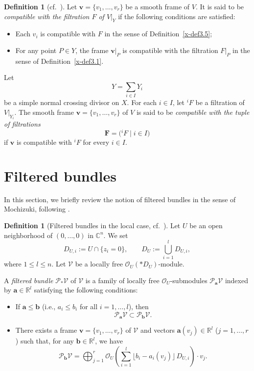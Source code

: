 \documentclass[12pt,twoside]{amsart}
\theoremstyle{definition}
\newtheorem{defn}[thm]{Definition}
\begin{document}
\begin{defn}[{cf.~\cite[Definition 2.17]{mochizuki1}}]\label{x-def3.6}
Let $\bm v=\{v_1,\ldots,v_r\}$ be a smooth frame of $V$.
It is said to be \emph{compatible with the filtration $F$ of $V|_Y$} if
the following conditions are satisfied:
\begin{itemize}
\item[(1)] Each $v_i$ is compatible with $F$ in the sense of
Definition~\ref{x-def3.5};
\item[(2)] For any point $P\in Y$, the frame $\bm v|_P$
is compatible with the filtration $F|_P$
in the sense of Definition~\ref{x-def3.1}. 
\end{itemize} 

Let
\[
Y=\sum_{i\in I} Y_i
\]
be a simple normal crossing divisor on $X$.
For each $i\in I$, let ${}^i\!F$ be a filtration of $V|_{Y_i}$.
The smooth frame $\bm v=\{v_1,\ldots,v_r\}$ of $V$ is said to be
\emph{compatible with the tuple of filtrations}
\[
\mathbf F=\bigl({}^i\!F \mid i\in I\bigr)
\]
if $\bm v$ is compatible with ${}^i\!F$ for every $i\in I$. 
\end{defn}

\section{Filtered bundles}\label{x-sec4}

In this section, we briefly review the notion of filtered bundles in the
sense of Mochizuki, following 
\cite[2.3 Filtered bundles]{mochizuki5}. 

\begin{defn}[{Filtered bundles in the local case, cf.~\cite[2.3.1]{mochizuki5}}]\label{x-def4.1}
Let $U$ be an open neighborhood of $(0,\ldots,0)$ in $\mathbb C^n$.
We set
\[
D_{U,i} := U \cap \{ z_i = 0 \}, \qquad
D_U := \bigcup_{i=1}^l D_{U,i},
\]
where $1 \le l \le n$.
Let $\mathcal V$ be a locally free $\mathcal O_U(\ast D_U)$-module.

A \emph{filtered bundle} $\mathcal P_\ast \mathcal V$ of $\mathcal V$
is a family of locally free $\mathcal O_U$-submodules
$\mathcal P_{\bm a} \mathcal V$ indexed by $\bm a \in \mathbb R^l$
satisfying the following conditions:
\begin{itemize}
\item[(1)]
If $\bm a \le \bm b$ (i.e., $a_i \le b_i$ for all $i=1,\ldots,l$), then
\[
\mathcal P_{\bm a} \mathcal V \subset \mathcal P_{\bm b} \mathcal V .
\]

\item[(2)]
There exists a frame
$\bm v = \{v_1,\ldots,v_r\}$ of $\mathcal V$
and vectors $\bm a(v_j) \in \mathbb R^l$ ($j=1,\ldots,r$) such that,
for any $\bm b \in \mathbb R^l$, we have
\begin{equation}\label{x-eq4.1}
\mathcal P_{\bm b} \mathcal V
=
\bigoplus_{j=1}^r
\mathcal O_U \!\left(
\sum_{i=1}^l
\lfloor b_i - a_i(v_j) \rfloor \, D_{U,i}
\right)
\cdot v_j .
\end{equation}
\end{itemize}
\end{defn}
\end{document}
